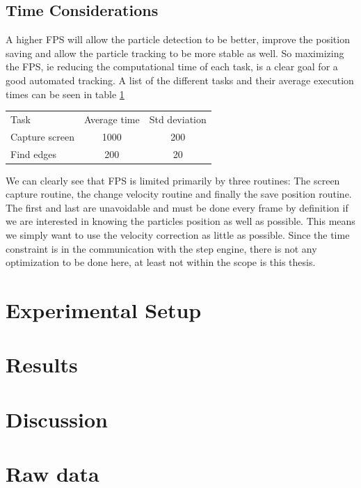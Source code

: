 \documentclass[]{report}
\begin{document}
\section{Time Considerations}\label{sec:time considerations}
A higher FPS will allow the particle detection to be better, improve the position saving and allow the particle tracking to be more stable as well. So maximizing the FPS, ie reducing the computational time of each task, is a clear goal for a good automated tracking. A list of the different tasks and their average execution times can be seen in table \ref{tab:benchmarks}

\begin{table}[H]
 \begin{tabular}{l | c | c } 
 Task  			&  Average time & Std deviation \\
 Capture screen & 1000 			& 200 \\
 Find edges 	& 200			& 20 \\
 \end{tabular}\label{tab:benchmarks}
\end{table}

We can clearly see that FPS is limited primarily by three routines: The screen capture routine, the change velocity routine and finally the save position routine. The first and last are unavoidable and must be done every frame by definition if we are interested in knowing the particles position as well as possible. This means we simply want to use the velocity correction as little as possible. Since the time constraint is in the communication with the step engine, there is not any optimization to be done here, at least not within the scope is this thesis. 


\chapter{Experimental Setup}


\chapter{Results}
\chapter{Discussion}

\appendix
\chapter{Raw data}
\end{document}
